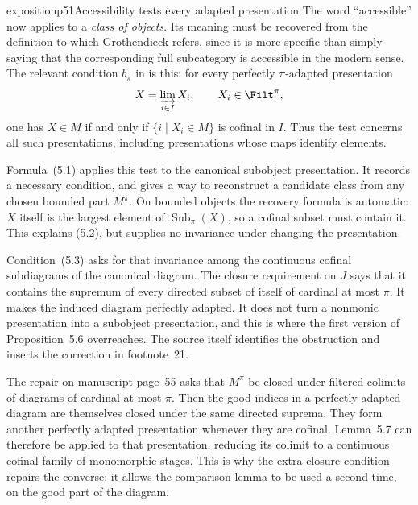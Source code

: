 \begin{dcomment}{exposition}{p51}{Accessibility tests every adapted presentation}
The word ``accessible'' now applies to a \emph{class of objects}. Its meaning must be recovered from the definition to which Grothendieck refers, since it is more specific than simply saying that the corresponding full subcategory is accessible in the modern sense. The relevant condition $b_\pi$ in \citep[Chapter~XIII, manuscript pp.~88--89]{GrothendieckDerivateursXIII} is this: for every perfectly $\pi$-adapted presentation
\[
 X=\varinjlim_{i\in I}X_i,\qquad X_i\in\Filt^\pi,
\]
one has $X\in M$ if and only if $\{i\mid X_i\in M\}$ is cofinal in $I$. Thus the test concerns all such presentations, including presentations whose maps identify elements.

Formula~(5.1) applies this test to the canonical subobject presentation. It records a necessary condition, and gives a way to reconstruct a candidate class from any chosen bounded part $M^\pi$. On bounded objects the recovery formula is automatic: $X$ itself is the largest element of $\operatorname{Sub}_{\pi}(X)$, so a cofinal subset must contain it. This explains (5.2), but supplies no invariance under changing the presentation.

Condition~(5.3) asks for that invariance among the continuous cofinal subdiagrams of the canonical diagram. The closure requirement on $J$ says that it contains the supremum of every directed subset of itself of cardinal at most $\pi$. It makes the induced diagram perfectly adapted. It does not turn a nonmonic presentation into a subobject presentation, and this is where the first version of Proposition~5.6 overreaches. The source itself identifies the obstruction and inserts the correction in footnote~21.

The repair on manuscript page~55 asks that $M^\pi$ be closed under filtered colimits of diagrams of cardinal at most $\pi$. Then the good indices in a perfectly adapted diagram are themselves closed under the same directed suprema. They form another perfectly adapted presentation whenever they are cofinal. Lemma~5.7 can therefore be applied to that presentation, reducing its colimit to a continuous cofinal family of monomorphic stages. This is why the extra closure condition repairs the converse: it allows the comparison lemma to be used a second time, on the good part of the diagram.
\end{dcomment}


